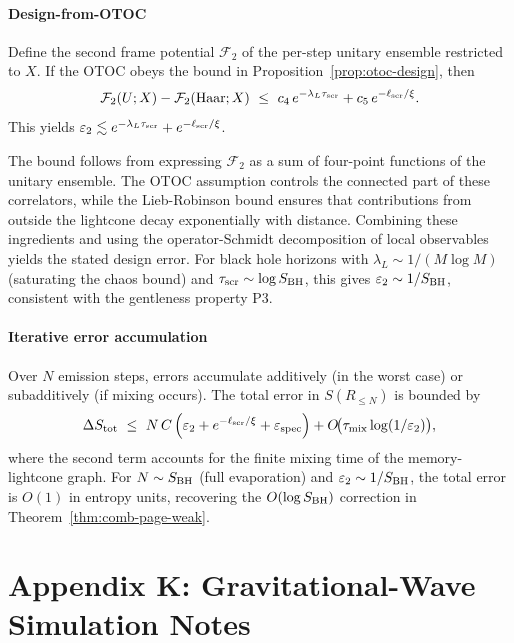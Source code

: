 \documentclass[a4paper,11pt]{article}
\theoremstyle{plain}
\theoremstyle{definition}
\theoremstyle{remark}
\begin{document}
\paragraph{Design-from-OTOC}
Define the second frame potential $\mathcal{F}_2$ of the per-step unitary ensemble restricted to $X$. If the OTOC obeys the bound in Proposition~\ref{prop:otoc-design}, then
\begin{equation}
\mathcal{F}_2(U;X) - \mathcal{F}_2(\text{Haar};X) \ \le\ c_4\, e^{-\lambda_L \tau_{\rm scr}} + c_5\, e^{-\ell_{\rm scr}/\xi}.
\end{equation}
This yields $\varepsilon_2 \lesssim e^{-\lambda_L \tau_{\rm scr}} + e^{-\ell_{\rm scr}/\xi}$.

The bound follows from expressing $\mathcal{F}_2$ as a sum of four-point functions of the unitary ensemble. The OTOC assumption controls the connected part of these correlators, while the Lieb-Robinson bound ensures that contributions from outside the lightcone decay exponentially with distance. Combining these ingredients and using the operator-Schmidt decomposition of local observables yields the stated design error. For black hole horizons with $\lambda_L \sim 1/(M \log M)$ (saturating the chaos bound) and $\tau_{\rm scr} \sim \log S_{\rm BH}$, this gives $\varepsilon_2 \sim 1/S_{\rm BH}$, consistent with the gentleness property P3.

\paragraph{Iterative error accumulation}
Over $N$ emission steps, errors accumulate additively (in the worst case) or subadditively (if mixing occurs). The total error in $S(R_{\le N})$ is bounded by
\begin{equation}
\Delta S_{\rm tot} \ \le\ N\, C\left(\varepsilon_2 + e^{-\ell_{\rm scr}/\xi} + \varepsilon_{\rm spec}\right) + O\!\big(\tau_{\rm mix} \log(1/\varepsilon_2)\big),
\end{equation}
where the second term accounts for the finite mixing time of the memory-lightcone graph. For $N \sim S_{\rm BH}$ (full evaporation) and $\varepsilon_2 \sim 1/S_{\rm BH}$, the total error is $O(1)$ in entropy units, recovering the $O(\log S_{\rm BH})$ correction in Theorem~\ref{thm:comb-page-weak}.


\section{Appendix K: Gravitational-Wave Simulation Notes}
\label{app:gw-sim}
\end{document}
